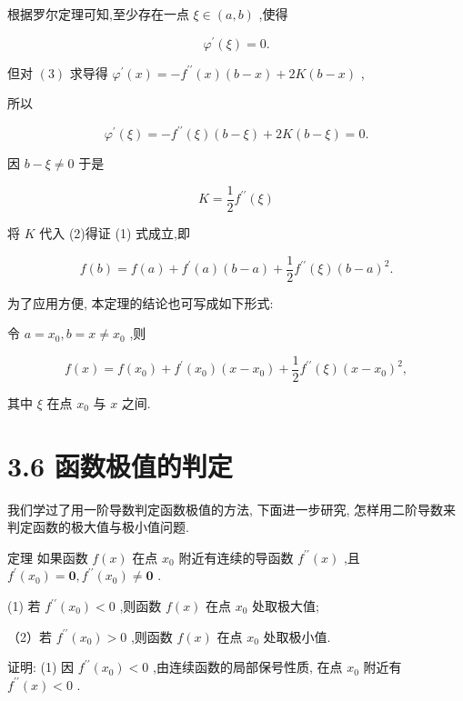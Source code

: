 \documentclass[10pt]{article}
\begin{document}
根据罗尔定理可知,至少存在一点 \(\xi \in \left( {a,b}\right)\) ,使得

\[
{\varphi }^{\prime }\left( \xi \right) = 0.
\]

但对 \(\left( 3\right)\) 求导得 \({\varphi }^{\prime }\left( x\right) = - {f}^{\prime \prime }\left( x\right) \left( {b - x}\right) + {2K}\left( {b - x}\right)\) ,

所以

\[
{\varphi }^{\prime }\left( \xi \right) = - {f}^{\prime \prime }\left( \xi \right) \left( {b - \xi }\right) + {2K}\left( {b - \xi }\right) = 0.
\]

因 \(b - \xi \neq 0\) 于是

\[
K = \frac{1}{2}{f}^{\prime \prime }\left( \xi \right)
\]

将 \(K\) 代入 (2)得证 (1) 式成立,即

\[
f\left( b\right) = f\left( a\right) + {f}^{\prime }\left( a\right) \left( {b - a}\right) + \frac{1}{2}{f}^{\prime \prime }\left( \xi \right) {\left( b - a\right) }^{2}.
\]

为了应用方便, 本定理的结论也可写成如下形式:

令 \(a = {x}_{0},b = x \neq {x}_{0}\) ,则

\[
f\left( x\right) = f\left( {x}_{0}\right) + {f}^{\prime }\left( {x}_{0}\right) \left( {x - {x}_{0}}\right) + \frac{1}{2}{f}^{\prime \prime }\left( \xi \right) {\left( x - {x}_{0}\right) }^{2}, \tag{4}
\]

其中 \(\xi\) 在点 \({x}_{0}\) 与 \(x\) 之间.

\section*{3.6 函数极值的判定}

我们学过了用一阶导数判定函数极值的方法, 下面进一步研究, 怎样用二阶导数来判定函数的极大值与极小值问题.

定理 如果函数 \(f\left( x\right)\) 在点 \({x}_{0}\) 附近有连续的导函数 \({f}^{\prime \prime }\left( x\right)\) ,且 \({f}^{\prime }\left( {x}_{0}\right) = \mathbf{0},{f}^{\prime \prime }\left( {x}_{0}\right) \neq \mathbf{0}\) .

(1) 若 \({f}^{\prime \prime }\left( {x}_{0}\right) < 0\) ,则函数 \(f\left( x\right)\) 在点 \({x}_{0}\) 处取极大值;

（2）若 \({f}^{\prime \prime }\left( {x}_{0}\right) > 0\) ,则函数 \(f\left( x\right)\) 在点 \({x}_{0}\) 处取极小值.

证明: (1) 因 \({f}^{\prime \prime }\left( {x}_{0}\right) < 0\) ,由连续函数的局部保号性质, 在点 \({x}_{0}\) 附近有 \({f}^{\prime \prime }\left( x\right) < 0\) .
\end{document}
